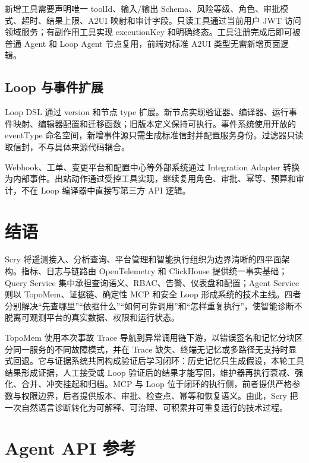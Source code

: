 \documentclass[conference,10pt]{IEEEtran}
\begin{document}
新增工具需要声明唯一 toolId、输入/输出 Schema、风险等级、角色、审批模式、超时、结果上限、A2UI 映射和审计字段。只读工具通过当前用户 JWT 访问领域服务；有副作用工具实现 executionKey 和明确终态。工具注册完成后即可被普通 Agent 和 Loop Agent 节点复用，前端对标准 A2UI 类型无需新增页面逻辑。

\subsection{Loop 与事件扩展}

Loop DSL 通过 version 和节点 type 扩展。新节点实现验证器、编译器、运行事件映射、编辑器配置和迁移函数；旧版本定义保持可执行。事件系统使用开放的 eventType 命名空间，新增事件源只需生成标准信封并配置服务身份。过滤器只读取信封，不与具体来源代码耦合。

Webhook、工单、变更平台和配置中心等外部系统通过 Integration Adapter 转换为内部事件。出站动作通过受控工具实现，继续复用角色、审批、幂等、预算和审计，不在 Loop 编译器中直接写第三方 API 逻辑。

\section{结语}

Scry 将遥测接入、分析查询、平台管理和智能执行组织为边界清晰的四平面架构。指标、日志与链路由 OpenTelemetry 和 ClickHouse 提供统一事实基础；Query Service 集中承担查询语义、RBAC、告警、仪表盘和配置；Agent Service 则以 TopoMem、证据链、确定性 MCP 和安全 Loop 形成系统的技术主线。四者分别解决“先查哪里”“依据什么”“如何可靠调用”和“怎样重复执行”，使智能诊断不脱离可观测平台的真实数据、权限和运行状态。

TopoMem 使用本次事故 Trace 导航到异常调用链下游，以错误签名和记忆分块区分同一服务的不同故障模式，并在 Trace 缺失、终端无记忆或多路径无支持时显式回退。它与证据系统共同构成验证后学习闭环：历史记忆只生成假设，本轮工具结果形成证据，人工接受或 Loop 验证后的结果才能写回，维护器再执行衰减、强化、合并、冲突挂起和归档。MCP 与 Loop 位于闭环的执行侧，前者提供严格参数与权限边界，后者提供版本、审批、检查点、幂等和恢复语义。由此，Scry 把一次自然语言诊断转化为可解释、可治理、可积累并可重复运行的技术过程。

\clearpage
\nobalance
\onecolumn
\appendices

\section{Agent API 参考}
\end{document}
